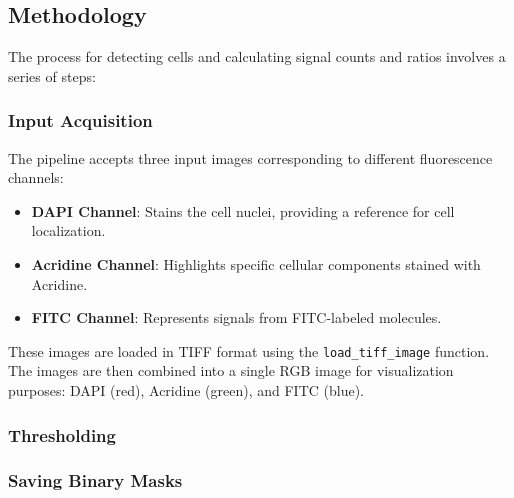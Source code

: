 \documentclass[a4paper,12pt]{article}
\begin{document}
\subsection{Methodology}

The process for detecting cells and calculating signal counts and ratios involves a series of steps:

\subsubsection{Input Acquisition}

The pipeline accepts three input images corresponding to different fluorescence channels:
\begin{itemize}
    \item \textbf{DAPI Channel}: Stains the cell nuclei, providing a reference for cell localization.
    \item \textbf{Acridine Channel}: Highlights specific cellular components stained with Acridine.
    \item \textbf{FITC Channel}: Represents signals from FITC-labeled molecules.
\end{itemize}
These images are loaded in TIFF format using the \texttt{load\_tiff\_image} function. The images are then combined into a single RGB image for visualization purposes: DAPI (red), Acridine (green), and FITC (blue).

\subsubsection{Thresholding}


\subsubsection{Saving Binary Masks}
\end{document}
